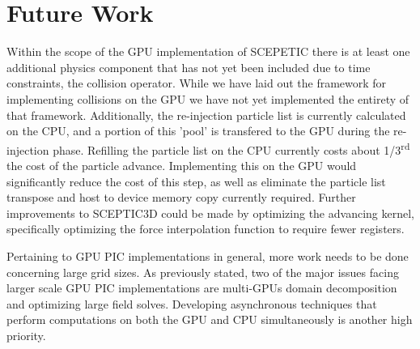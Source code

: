 \section{Future Work}
Within the scope of the GPU implementation of SCEPETIC there is at least one additional physics component that has not yet been included due to time constraints, the collision operator. While we have laid out the framework for implementing collisions on the GPU we have not yet implemented the entirety of that framework. Additionally, the re-injection particle list is currently calculated on the CPU, and a portion of this 'pool' is transfered to the GPU during the re-injection phase. Refilling the particle list on the CPU currently costs about 1/3\textsuperscript{rd} the cost of the particle advance. Implementing this on the GPU would significantly reduce the cost of this step, as well as eliminate the particle list transpose and host to device memory copy currently required. Further improvements to SCEPTIC3D could be made by optimizing the advancing kernel, specifically optimizing the force interpolation function to require fewer registers. 

Pertaining to GPU PIC implementations in general, more work needs to be done concerning large grid sizes. As previously stated, two of the major issues facing larger scale GPU PIC implementations are multi-GPUs domain decomposition and optimizing large field solves. Developing asynchronous techniques that perform computations on both the GPU and CPU simultaneously is another high priority. 



